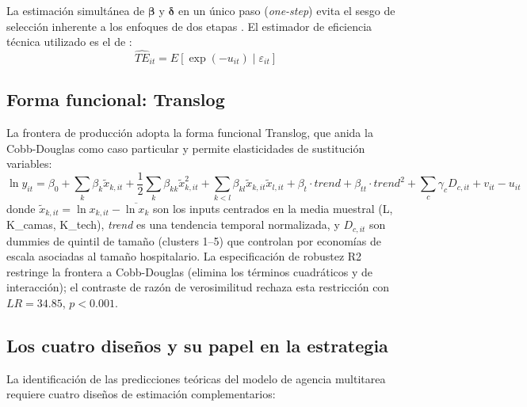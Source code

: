 La estimación simultánea de $\boldsymbol{\beta}$ y $\boldsymbol{\delta}$ en un único paso (\emph{one-step}) evita el sesgo de selección inherente a los enfoques de dos etapas \citep{wang2002}. El estimador de eficiencia técnica utilizado es el de \citet{jondrow1982estimation}:
%
\begin{equation}
  \widehat{TE}_{it} = E\!\left[\exp(-u_{it}) \mid \varepsilon_{it}\right]
  \label{eq:jlms}
\end{equation}

\subsection{Forma funcional: Translog}
\label{subsec:translog}

La frontera de producción adopta la forma funcional Translog, que anida la Cobb-Douglas como caso particular y permite elasticidades de sustitución variables:
%
\begin{equation}
  \ln y_{it} = \beta_0 + \sum_k \beta_k \tilde{x}_{k,it} + \frac{1}{2}\sum_k \beta_{kk} \tilde{x}_{k,it}^2
    + \sum_{k<l} \beta_{kl} \tilde{x}_{k,it}\tilde{x}_{l,it}
    + \beta_t \cdot \textit{trend} + \beta_{tt} \cdot \textit{trend}^2
    + \sum_c \gamma_c D_{c,it} + v_{it} - u_{it}
  \label{eq:translog}
\end{equation}
%
donde $\tilde{x}_{k,it} = \ln x_{k,it} - \overline{\ln x_k}$ son los inputs centrados en la media muestral (L, K\_camas, K\_tech), \textit{trend} es una tendencia temporal normalizada, y $D_{c,it}$ son dummies de quintil de tamaño (clusters 1--5) que controlan por economías de escala asociadas al tamaño hospitalario. La especificación de robustez R2 restringe la frontera a Cobb-Douglas (elimina los términos cuadráticos y de interacción); el contraste de razón de verosimilitud rechaza esta restricción con $LR = 34.85$, $p < 0.001$.

\subsection{Los cuatro diseños y su papel en la estrategia}
\label{subsec:disenios}

La identificación de las predicciones teóricas del modelo de agencia multitarea requiere cuatro diseños de estimación complementarios:

